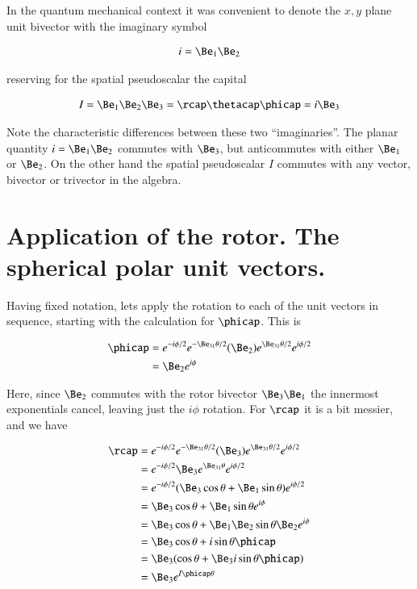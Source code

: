 In the quantum mechanical context it was convenient to denote the $x,y$ plane unit bivector with the imaginary symbol

\begin{align}\label{eqn:sphericalPolarUnit:foo3}
i = \Be_1 \Be_2
\end{align}

reserving for the spatial pseudoscalar the capital

\begin{align}\label{eqn:sphericalPolarUnit:foo4}
I = \Be_1 \Be_2 \Be_3 = \rcap \thetacap \phicap = i \Be_3
\end{align}

Note the characteristic differences between these two ``imaginaries''.  The planar quantity $i = \Be_1 \Be_2$ commutes with $\Be_3$, but anticommutes with either $\Be_1$ or $\Be_2$.  On the other hand the spatial pseudoscalar $I$ commutes with any vector, bivector or trivector in the algebra.

\section{Application of the rotor.  The spherical polar unit vectors.}

Having fixed notation, lets apply the rotation to each of the unit vectors in sequence, starting with the calculation for $\phicap$.  This is

\begin{align*}
\phicap 
&= e^{-i \phi/2} e^{-\Be_{31}\theta/2} (\Be_2) e^{\Be_{31}\theta/2} e^{i\phi/2} \\
&= \Be_2 e^{i\phi} 
\end{align*}

Here, since $\Be_2$ commutes with the rotor bivector $\Be_3 \Be_1$ the innermost exponentials cancel, leaving just the $i\phi$ rotation.  For $\rcap$ it is a bit messier, and we have

\begin{align*}
\rcap 
&= e^{-i \phi/2} e^{-\Be_{31}\theta/2} (\Be_3) e^{\Be_{31}\theta/2} e^{i\phi/2} \\
&= e^{-i \phi/2} \Be_3 e^{\Be_{31}\theta} e^{i\phi/2} \\
&= e^{-i \phi/2} (\Be_3 \cos\theta + \Be_1 \sin\theta) e^{i\phi/2} \\
&= \Be_3 \cos\theta + \Be_1 \sin\theta e^{i\phi} \\
&= \Be_3 \cos\theta + \Be_1 \Be_2 \sin\theta \Be_2 e^{i\phi} \\
&= \Be_3 \cos\theta + i \sin\theta \phicap \\
&= \Be_3 (\cos\theta + \Be_3 i \sin\theta \phicap) \\
&= \Be_3 e^{I\phicap\theta} 
\end{align*}

